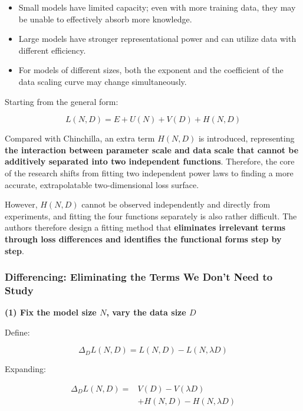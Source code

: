 \documentclass[
  english,
  11pt,
  a4paper,
]{article}
\providecommand{\tightlist}{%
  \setlength{\itemsep}{0pt}\setlength{\parskip}{0pt}}
\newenvironment{NotesFormula}{%
  \par\noindent\begin{minipage}{\linewidth}%
  \setlength{\parindent}{2em}%
  \setlength{\parskip}{0.35em}%
}{\end{minipage}\par}
\begin{document}
\begin{itemize}
\tightlist
\item
  Small models have limited capacity; even with more training data, they
  may be unable to effectively absorb more knowledge.
\item
  Large models have stronger representational power and can utilize data
  with different efficiency.
\item
  For models of different sizes, both the exponent and the coefficient
  of the data scaling curve may change simultaneously.
\end{itemize}

\begin{NotesFormula}

Starting from the general form:

\[\boxed{L(N,D)=E+U(N)+V(D)+H(N,D)}\]

\end{NotesFormula}

Compared with Chinchilla, an extra term \(H(N,D)\) is introduced,
representing \textbf{the interaction between parameter scale and data
scale that cannot be additively separated into two independent
functions}. Therefore, the core of the research shifts from fitting two
independent power laws to finding a more accurate, extrapolatable
two-dimensional loss surface.

However, \(H(N,D)\) cannot be observed independently and directly from
experiments, and fitting the four functions separately is also rather
difficult. The authors therefore design a fitting method that
\textbf{eliminates irrelevant terms through loss differences and
identifies the functional forms step by step}.

\subsubsection{Differencing: Eliminating the Terms We Don't Need to
Study}\label{differencing-eliminating-the-terms-we-dont-need-to-study}

\textbf{(1) Fix the model size \(N\), vary the data size \(D\)}

\begin{NotesFormula}

Define:

\[\Delta_DL(N,D)=L(N,D)-L(N,\lambda D)\]

\end{NotesFormula}

\begin{NotesFormula}

Expanding:

\[\begin{aligned}
\Delta_DL(N,D)={}&V(D)-V(\lambda D)\\
&+H(N,D)-H(N,\lambda D)
\end{aligned}\]

\end{NotesFormula}
\end{document}
